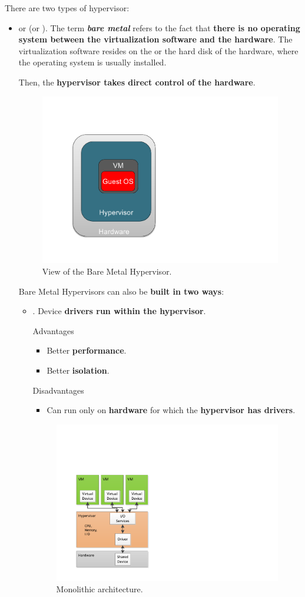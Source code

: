 \highspace
There are two types of hypervisor:
\begin{itemize}
	\item {} or  (or ). The term \textbf{\emph{bare metal}} refers to the fact that \textbf{there is no operating system between the virtualization software and the hardware}. The virtualization software resides on the  or the hard disk of the hardware, where the operating system is usually installed.
	
	Then, the \textbf{hypervisor takes direct control of the hardware}.
	
	\begin{figure}[!htp]
		\centering
		\includegraphics[width=.3\textwidth]{img/vm-4.pdf}
		\caption{View of the Bare Metal Hypervisor.}
	\end{figure}
	\newpage
	Bare Metal Hypervisors can also be \textbf{built in two ways}:
	\begin{itemize}
		\item {}. Device \textbf{drivers run within the hypervisor}.
		\begin{flushleft}
			\textcolor{Green3}{ Advantages}
		\end{flushleft}
		\begin{itemize}
			\item Better \textbf{performance}.
			\item Better \textbf{isolation}.
		\end{itemize}
		\begin{flushleft}
			\textcolor{Red2}{ Disadvantages}
		\end{flushleft}
		\begin{itemize}
			\item Can run only on \textbf{hardware} for which the \textbf{hypervisor has drivers}.
		\end{itemize}
		\begin{figure}[!htp]
			\centering
			\includegraphics[width=.42\textwidth]{img/vm-5.pdf}
			\caption{Monolithic architecture.}
		\end{figure}
		

\end{itemize}
\end{itemize}
